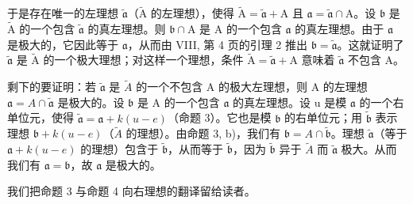 于是存在唯一的左理想 \(\widetilde{\mathfrak{a}}\)（\(\widetilde{\mathrm{A}}\) 的左理想），使得 \(\widetilde{\mathrm{A}} = \widetilde{\mathfrak{a}} + \mathrm{A}\) 且 \(\mathfrak{a} = \widetilde{\mathfrak{a}} \cap \mathrm{A}\)。设 \(\mathfrak{b}\) 是 \(\widetilde{\mathrm{A}}\) 的一个包含 \(\widetilde{\mathfrak{a}}\) 的真左理想。则 \(\mathfrak{b} \cap \mathrm{A}\) 是 \(\mathrm{A}\) 的一个包含 \(\mathfrak{a}\) 的真左理想。由于 \(\mathfrak{a}\) 是极大的，它因此等于 \(\mathfrak{a}\)，从而由 VIII, 第 4 页的引理 2 推出 \(\mathfrak{b} = \widetilde{\mathfrak{a}}\)。这就证明了 \(\widetilde{\mathfrak{a}}\) 是 \(\widetilde{\mathrm{A}}\) 的一个极大理想；对这样一个理想，条件 \(\widetilde{\mathrm{A}} = \widetilde{\mathfrak{a}} + \mathrm{A}\) 意味着 \(\widetilde{\mathfrak{a}}\) 不包含 A。

剩下的要证明：若 \(\widetilde{\mathfrak{a}}\) 是 \(\tilde{A}\) 的一个不包含 A 的极大左理想，则 A 的左理想 \(\mathfrak{a} = A \cap \widetilde{\mathfrak{a}}\) 是极大的。设 \(\mathfrak{b}\) 是 A 的一个包含 \(\mathfrak{a}\) 的真左理想。设 u 是模 \(\mathfrak{a}\) 的一个右单位元，使得 \(\widetilde{\mathfrak{a}} = \mathfrak{a} + k(u - e)\)（命题 3）。它也是模 \(\mathfrak{b}\) 的右单位元；用 \(\widetilde{\mathfrak{b}}\) 表示理想 \(\mathfrak{b} + k(u - e)\)（\(\tilde{A}\) 的理想）。由命题 3, b)，我们有 \(\mathfrak{b} = A \cap \widetilde{\mathfrak{b}}\)。理想 \(\widetilde{\mathfrak{a}}\)（等于 \(\mathfrak{a} + k(u - e)\) 的理想）包含于 \(\widetilde{\mathfrak{b}}\)，从而等于 \(\widetilde{\mathfrak{b}}\)，因为 \(\widetilde{\mathfrak{b}}\) 异于 \(\tilde{A}\) 而 \(\widetilde{\mathfrak{a}}\) 极大。从而我们有 \(\mathfrak{a} = \mathfrak{b}\)，故 \(\mathfrak{a}\) 是极大的。

我们把命题 3 与命题 4 向右理想的翻译留给读者。

